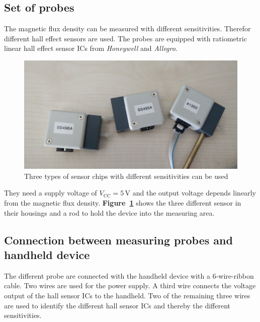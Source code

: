 \documentclass[twoside,accentcolor=tud2a,nochapname,11pt]{tudexercise}
\begin{document}
\subsection{Set of probes}
The magnetic flux density can be measured with different sensitivities. Therefor different hall effect sensors are used. The probes are equipped with ratiometric linear hall effect sensor ICs from \textit{Honeywell} and \textit{Allegro}.
\begin{figure}[ht]%
\centering
\includegraphics[width=.5\columnwidth]{../pictures/set_of_probes}%
\caption{Three types of sensor chips with different sensitivities can be used}%
\label{pic:set_of_probes}%
\end{figure}
They need a supply voltage of $V_\mathrm{CC} = 5\,\mathrm{V}$ and the output voltage depends linearly from the magnetic flux density. \textbf{Figure~\ref{pic:set_of_probes}} shows the three different sensor in their housings and a rod to hold the device into the measuring area.

\subsection{Connection between measuring probes and handheld device}
\label{chap:connection}
The different probe are connected with the handheld device with a 6-wire-ribbon cable. Two wires are used for the power supply. A third wire connects the voltage output of the hall sensor ICs to the handheld. Two of the remaining three wires are used to identify the different hall sensor ICs and thereby the different sensitivities.
\end{document}
